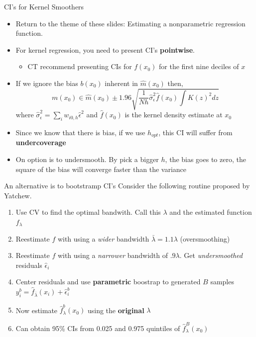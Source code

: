 \begin{frame}{CI's for Kernel Smoothers}
  \begin{itemize}
    \item Return to the theme of these slides: Estimating a nonparametric regression function. 
    \item For kernel regression, you need to present CI's \textbf{pointwise}. 
    \begin{itemize}
      \item CT recommend presenting CIs for $f(x_0)$ for the first nine deciles of $x$
    \end{itemize}

\pause

    \item If we ignore the bias $b(x_0)$ inherent in $\hat m(x_0)$ then, 
    $$ m(x_0) \in \hat m(x_0) \pm 1.96 \sqrt{\frac{1}{Nh}{\hat \sigma_\epsilon^2}{\hat f(x_0)} \int K(z)^2dz} $$
    where $\hat \sigma_\epsilon^2 = \sum_i w_{i0,h}\hat \epsilon^2$ and $\hat f(x_0)$ is the kernel density estimate at $x_0$
    \item Since we know that there is bias, if we use $h_{opt}$, this CI will suffer from \textbf{undercoverage}
    \item On option is to undersmooth. By pick a bigger $h$, the bias goes to zero, the square of the bias will converge faster than the variance 
  \end{itemize}
\end{frame}

\begin{frame}{An alternative is to bootstramp CI's}
  Consider the following routine proposed by Yatchew. 
  \begin{enumerate}
    \item Use CV to find the optimal bandwith. Call this $\lambda$ and the estimated function $f_\lambda$
    \item Reestimate $f$ with using a \textit{wider} bandwidth $\bar \lambda = 1.1 \lambda$ (oversmoothing)
    \item Reestimate $f$ with using a \textit{narrower} bandwidth of $.9 \lambda$. Get \textit{undersmoothed} residuals $\hat \epsilon_i$
    \item Center residuals and use \textbf{parametric} boostrap to generated $B$ samples $y_i^b = \hat f_{\bar \lambda}(x_i) + \hat \epsilon_i^b$
    \item Now estimate $\hat f_\lambda^b(x_0)$ using the \textbf{original} $\lambda$
    \item Can obtain 95\% CIs from 0.025 and 0.975 quintiles of $\hat f^B_{\lambda}(x_0)$
  \end{enumerate}
\end{frame}

